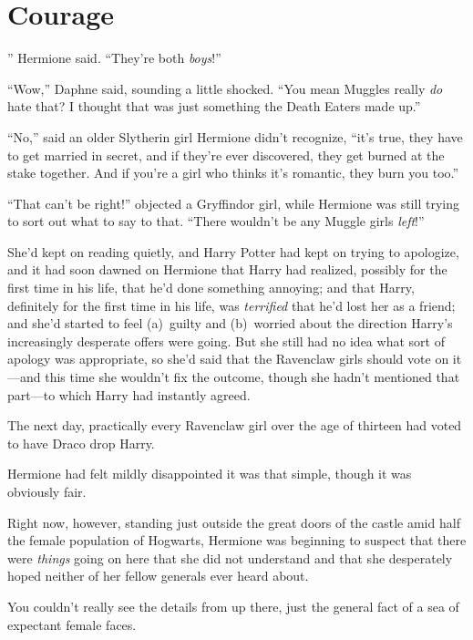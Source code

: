 \chapter{Courage}

” Hermione said.
“They’re both \emph{boys}!”

\hplettrineextrapara
“Wow,” Daphne said, sounding a little shocked.
“You mean Muggles really \emph{do} hate that? I thought that was just something the Death Eaters made up.”

“No,” said an older Slytherin girl Hermione didn’t recognize, “it’s true, they have to get married in secret, and if they’re ever discovered, they get burned at the stake together. And if you’re a girl who thinks it’s romantic, they burn you too.”

“That can’t be right!” objected a Gryffindor girl, while Hermione was still trying to sort out what to say to that.
“There wouldn’t be any Muggle girls \emph{left}!”

She’d kept on reading quietly, and Harry Potter had kept on trying to apologize, and it had soon dawned on Hermione that Harry had realized, possibly for the first time in his life, that he’d done something annoying; and that Harry, definitely for the first time in his life, was \emph{terrified} that he’d lost her as a friend; and she’d started to feel (a)~guilty and (b)~worried about the direction Harry’s increasingly desperate offers were going. But she still had no idea what sort of apology was appropriate, so she’d said that the Ravenclaw girls should vote on it—and this time she wouldn’t fix the outcome, though she hadn’t mentioned that part—to which Harry had instantly agreed.

The next day, practically every Ravenclaw girl over the age of thirteen had voted to have Draco drop Harry.

Hermione had felt mildly disappointed it was that simple, though it was obviously fair.

Right now, however, standing just outside the great doors of the castle amid half the female population of Hogwarts, Hermione was beginning to suspect that there were \emph{things} going on here that she did not understand and that she desperately hoped neither of her fellow generals ever heard about.

\later

You couldn’t really see the details from up there, just the general fact of a sea of expectant female faces.

